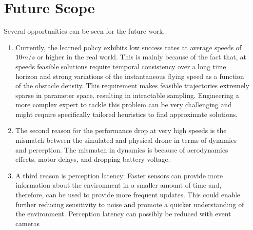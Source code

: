 \section{Future Scope}
Several opportunities can be seen for the future work. 
\begin{enumerate}
	\item Currently, the learned policy exhibits low success rates at average speeds of $10 m/s$ or higher in the real world. This is mainly because of the fact that, at speeds feasible solutions require temporal consistency over a long time horizon and strong variations of the instantaneous flying speed as a function of the obstacle density. This requirement makes feasible trajectories extremely sparse in parameter space, resulting in intractable sampling. Engineering a more complex expert to tackle this problem can be very challenging and might require specifically tailored heuristics to find approximate solutions. 
	
	\item The second reason for the performance drop at very high speeds is the mismatch between the simulated and physical drone in terms of dynamics and perception. The mismatch in dynamics is because of aerodynamics effects, motor delays, and dropping battery voltage.
	
	\item A third reason is perception latency: Faster sensors can provide more information about the environment in a smaller amount of time and, therefore, can be used to provide more frequent updates. This could enable further reducing sensitivity to noise and promote a quicker understanding of the environment. Perception latency can possibly be reduced with event cameras 
\end{enumerate}